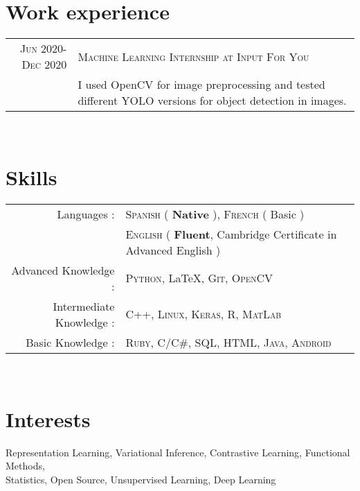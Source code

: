 \documentclass[a4paper,10pt]{article} %
\begin{document}
\section{Work experience}

\begin{tabular}{r|p{11cm}}	
  \textsc{Jun 2020-Dec 2020}  & \textsc{Machine Learning Internship at Input For You} \\
  & \footnotesize I used OpenCV for image preprocessing and tested different YOLO versions for object detection in images.
\end{tabular}\\






\section{Skills}

\begin{tabular}{rl}

  Languages : & \textsc{Spanish} ( \textbf{Native} ), \textsc{French} ( Basic ) \\
  & \textsc{English} ( \textbf{Fluent}, Cambridge Certificate in Advanced English ) \\


Advanced Knowledge : & \textsc{Python}, { \LaTeX}\setmainfont[SmallCapsFont=Fontin SmallCaps]{Fontin-Regular}, \textsc{Git}, \textsc{OpenCV}\\

Intermediate Knowledge : &  \textsc{C++},  \textsc{Linux}, \textsc{Keras}, \textsc{R}, \textsc{MatLab} \\

Basic Knowledge : & \textsc{Ruby}, \textsc{C/C\#},  \textsc{SQL}, \textsc{HTML}, \textsc{Java}, \textsc{Android}\\


\end{tabular}\\


\section{Interests}

Representation Learning, Variational Inference, Contrastive Learning, Functional Methods, \\
Statistics, Open Source, Unsupervised Learning, Deep Learning
\end{document}
